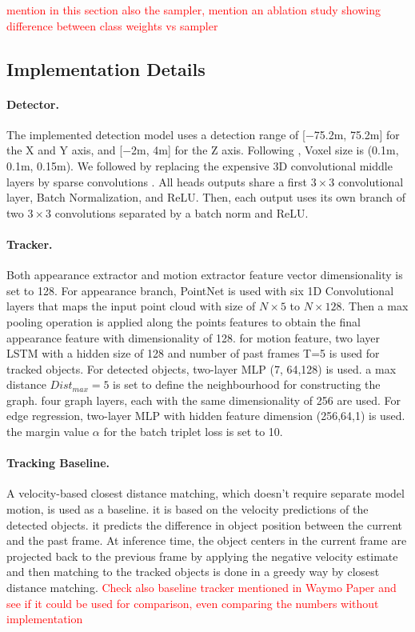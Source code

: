 \documentclass[10pt,twocolumn,letterpaper]{article}
\newcommand\myworries[1]{\textcolor{red}{#1}}
\begin{document}
\myworries{mention in this section also the sampler, mention an ablation study showing difference between class weights vs sampler}
\subsection{Implementation Details}

\paragraph{Detector.} The implemented detection model uses a detection range of [$-$75.2m, 75.2m] for the X and Y axis, and [$-$2m, 4m] for the Z axis. Following \cite{cite PV-RCNN}, Voxel size is (0.1m, 0.1m, 0.15m). We followed \cite{yan2018second, yin2020center} by replacing the expensive 3D convolutional middle layers by sparse convolutions \cite{graham20183d}. All heads outputs share a first $3 \times 3$ convolutional layer, Batch Normalization, and ReLU. Then, each output uses its own branch of two $3\times 3$ convolutions separated by a batch norm and ReLU.

\paragraph{Tracker.} Both appearance extractor and motion extractor feature vector dimensionality is set to 128. For appearance branch, PointNet is used with six 1D Convolutional layers that maps the input point cloud with size of $N \times 5$ to $N \times 128$. Then a max pooling operation is applied along the points features to obtain the final appearance feature with dimensionality of 128. for motion feature, two layer LSTM with a hidden size of 128 and number of past frames T=5 is used for tracked objects. For detected objects, two-layer MLP (7, 64,128) is used. a max distance $Dist_{max}=5$ is set to define the neighbourhood for constructing the graph. four graph layers, each with the same dimensionality of 256 are used. For edge regression, two-layer MLP with hidden feature dimension (256,64,1) is used. the margin value $\alpha$ for the batch triplet loss is set to 10.


\paragraph{Tracking Baseline.} A velocity-based closest distance matching, which doesn't require separate model motion, is used as a baseline. it is based on the velocity predictions of the detected objects. it predicts the difference in object position between the current and the past frame. At inference time, the object centers in the current frame are projected back to the previous frame by applying the negative velocity estimate and then matching to the tracked objects is done in a greedy way by closest distance matching.
\myworries{Check also baseline tracker mentioned in Waymo Paper and see if it could be used for comparison, even comparing the numbers without implementation}
\end{document}
